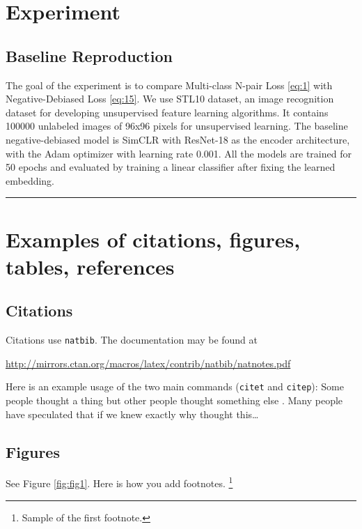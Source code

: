 \documentclass{article}
\begin{document}
\section{Experiment}
\subsection{Baseline Reproduction}

The goal of the experiment is to compare Multi-class N-pair Loss \ref{eq:1} with Negative-Debiased Loss \ref{eq:15}. We use STL10 \citep{pmlr-v15-coates11a} dataset, an image recognition dataset for developing unsupervised feature learning algorithms. It contains 100000 unlabeled images of 96x96 pixels for unsupervised learning. The baseline negative-debiased model is SimCLR \citep{Chen2020SimCLR} with ResNet-18 \citep{7780459} as the encoder architecture, with the Adam optimizer \citep{Diederik2014Adam} with learning rate 0.001. All the models are trained for 50 epochs and evaluated by training a linear classifier after fixing the learned embedding.




\noindent\rule{16cm}{0.4pt}


\section{Examples of citations, figures, tables, references}
\label{sec:others}

\subsection{Citations}
Citations use \verb+natbib+. The documentation may be found at
\begin{center}
	\url{http://mirrors.ctan.org/macros/latex/contrib/natbib/natnotes.pdf}
\end{center}

Here is an example usage of the two main commands (\verb+citet+ and \verb+citep+): Some people thought a thing \citep{kour2014real, hadash2018estimate} but other people thought something else \citep{kour2014fast}. Many people have speculated that if we knew exactly why \citet{kour2014fast} thought this\dots

\subsection{Figures}
\lipsum[10]
See Figure \ref{fig:fig1}. Here is how you add footnotes. \footnote{Sample of the first footnote.}
\lipsum[11]
\end{document}
